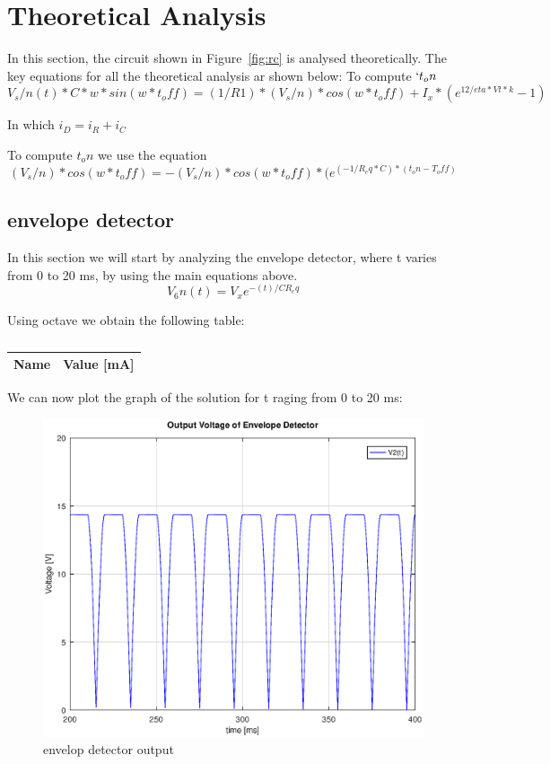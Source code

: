 \section{Theoretical Analysis}
\label{sec:analysis}

In this section, the circuit shown in Figure~\ref{fig:rc} is analysed
theoretically.
The key equations for all the theoretical analysis ar shown below:
To compute $`t_on$
\begin{equation}
	V_s/n(t)*C*w*sin(w*t_off) = (1/R1)*(V_s/n)*cos(w*t_off) +  I_x*(e^{12/eta*Vt*k} -1)
\end{equation}

In which $i_D = i_R + i_C$

To compute $t_on$ we use the equation
\begin{equation}
	(V_s/n)*cos(w*t_off) = -(V_s/n)*cos(w*t_off)*(e^{(-1/R_eq*C)*(t_on - T_off)}
\end{equation}


\subsection{envelope detector}

In this section we will start by analyzing the envelope detector, where t varies from 0 to 20 ms, by using the main equations above.
\begin{equation}
	V_6n(t) = V_xe^{-(t)/CR_eq}
\end{equation}

Using octave we obtain the following table:
\begin{table}[h!]
	\centering
	\begin{tabular}{|l|r|}
		\hline    
		{\bf Name} & {\bf Value [mA]} \\ \hline
		
	\end{tabular}
	\caption{ }
	\label{tab:op}
\end{table}

We can now plot the graph of the solution for t raging from 0 to 20 ms:

\begin{figure}[h!] \centering
\includegraphics[width=0.6\linewidth]{Output_Envelope_Detector.eps}
\caption{envelop detector output}
\label{fig:rc1}
\end{figure}
	
